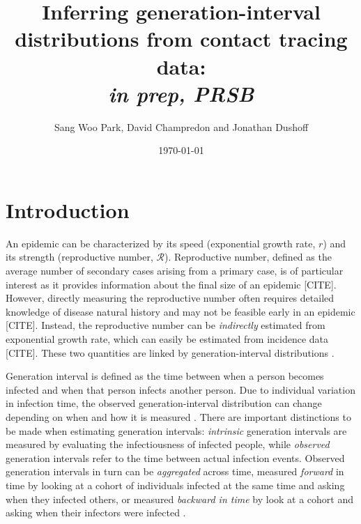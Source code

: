 \documentclass[12pt]{article}
\title{Inferring generation-interval distributions from contact tracing data: \\ \emph{in prep, PRSB}}
\author{Sang Woo Park, David Champredon and Jonathan Dushoff}
\date{\today}
\newcommand{\RR}{\ensuremath{{\mathcal R}}}
\begin{document}
\maketitle

\section{Introduction}

An epidemic can be characterized by its speed (exponential growth rate, $r$) and its strength (reproductive number, \RR).
Reproductive number, defined as the average number of secondary cases arising from a primary case, is of particular interest as it provides information about the final size of an epidemic [CITE].
However, directly measuring the reproductive number often requires detailed knowledge of disease natural history and may not be feasible early in an epidemic [CITE].
Instead, the reproductive number can be \emph{indirectly} estimated from exponential growth rate, which can easily be estimated from incidence data [CITE].
These two quantities are linked by generation-interval distributions \citep{wallinga2007generation}.

Generation interval is defined as the time between when a person becomes infected and when that person infects another person.
Due to individual variation in infection time, the observed generation-interval distribution can change depending on when and how it is measured \citep{svensson2007note, kenah2008generation, nishiura2010time}.
There are important distinctions to be made when estimating generation intervals: \emph{intrinsic} generation intervals are measured by evaluating the infectiousness of infected people,
while \emph{observed} generation intervals refer to the time between actual infection events.
Observed generation intervals in turn can be \emph{aggregated} across time, measured \emph{forward} in time by looking at a cohort of individuals infected at the same time and asking when they infected others, or measured \emph{backward in time} by look at a cohort and asking when their infectors were infected \citep{champredon2015intrinsic}.
\end{document}
